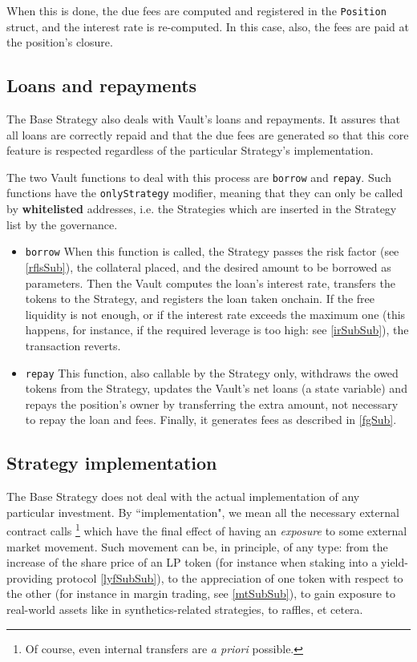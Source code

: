 \documentclass[a4paper,10 pt]{article}
\theoremstyle{definition}
\begin{document}
When this is done, the due fees are computed and registered in the \verb|Position| struct, and the interest rate is re-computed. In this case, also, the fees are paid at the position's closure.

\subsection{Loans and repayments}\label{lrSub}

The Base Strategy also deals with Vault's loans and repayments. It assures that all loans are correctly repaid and that the due fees are generated so that this core feature is respected regardless of the particular Strategy's implementation.

The two Vault functions to deal with this process are \verb|borrow| and \verb|repay|. Such functions have the \verb|onlyStrategy| modifier, meaning that they can only be called by {\bf whitelisted} addresses, i.e. the Strategies which are inserted in the Strategy list by the governance.

\begin{itemize}
\item \verb|borrow| When this function is called, the Strategy passes the risk factor (see \ref{rflsSub}), the collateral placed, and the desired amount to be borrowed as parameters. Then the Vault computes the loan's interest rate, transfers the tokens to the Strategy, and registers the loan taken onchain. If the free liquidity is not enough, or if the interest rate exceeds the maximum one (this happens, for instance, if the required leverage is too high: see \ref{irSubSub}), the transaction reverts.
\item \verb|repay| This function, also callable by the Strategy only, withdraws the owed tokens from the Strategy, updates the Vault's net loans (a state variable) and repays the position's owner by transferring the extra amount, not necessary to repay the loan and fees. Finally, it generates fees as described in \ref{fgSub}.
\end{itemize}

\subsection{Strategy implementation}\label{siSub}
The Base Strategy does not deal with the actual implementation of any particular investment. By ``implementation", we mean all the necessary external contract calls \footnote{Of course, even internal transfers are {\it a priori} possible.} which have the final effect of having an {\it exposure} to some external market movement. Such movement can be, in principle, of any type: from the increase of the share price of an LP token (for instance when staking into a yield-providing protocol \ref{lyfSubSub}), to the appreciation of one token with respect to the other (for instance in margin trading, see \ref{mtSubSub}), to gain exposure to real-world assets like in synthetics-related strategies, to raffles, et cetera.
\end{document}
